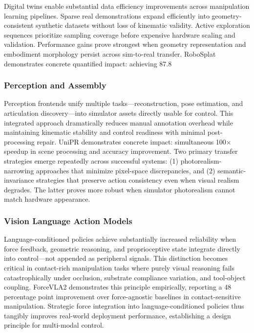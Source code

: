 ﻿\documentclass[11pt,a4paper]{article}
\begin{document}
Digital twins enable substantial data efficiency improvements across manipulation learning pipelines. Sparse real demonstrations expand efficiently into geometry-consistent synthetic datasets without loss of kinematic validity. Active exploration sequences prioritize sampling coverage before expensive hardware scaling and validation. Performance gains prove strongest when geometry representation and embodiment morphology persist across sim-to-real transfer. RoboSplat demonstrates concrete quantified impact: achieving 87.8%

\subsubsection{Perception and Assembly}

Perception frontends unify multiple tasks—reconstruction, pose estimation, and articulation discovery—into simulator assets directly usable for control. This integrated approach dramatically reduces manual annotation overhead while maintaining kinematic stability and control readiness with minimal post-processing repair. UniPR demonstrates concrete impact: simultaneous 100$\times$ speedup in scene processing and accuracy improvement. Two primary transfer strategies emerge repeatedly across successful systems: (1) photorealism-narrowing approaches that minimize pixel-space discrepancies, and (2) semantic-invariance strategies that preserve action consistency even when visual realism degrades. The latter proves more robust when simulator photorealism cannot match hardware appearance.

\subsubsection{Vision Language Action Models}

Language-conditioned policies achieve substantially increased reliability when force feedback, geometric reasoning, and proprioceptive state integrate directly into control—not appended as peripheral signals. This distinction becomes critical in contact-rich manipulation tasks where purely visual reasoning fails catastrophically under occlusion, substrate compliance variation, and tool-object coupling. ForceVLA2 demonstrates this principle empirically, reporting a 48 percentage point improvement over force-agnostic baselines in contact-sensitive manipulation. Strategic force integration into language-conditioned policies thus tangibly improves real-world deployment performance, establishing a design principle for multi-modal control.
\end{document}
